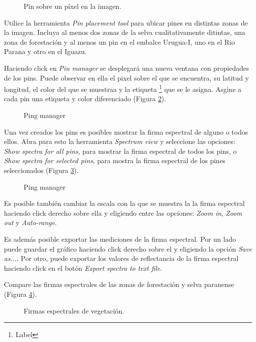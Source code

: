 \documentclass[a4paper,12pt]{book}
\begin{document}
\begin{figure}
    \caption{Pin sobre un píxel en la imagen.}
    \label{fig:pin}
\end{figure}

Utilice la herramienta \emph{Pin placement tool} para ubicar pines en distintas zonas de la imagen. Incluya al menos dos zonas de la selva cualitativamente ditintas, una zona de forestación y al menos un pin en el embalce Urugua-I, uno en el Rio Parana y otro en el Iguazu.

Haciendo click en \emph{Pin manager} se desplegará una nueva ventana  con propiedades de los pins. Puede observar en ella el pixel sobre el que se encuentra, su latitud y longitud, el color del que se muestraa y la etiqueta \footnote{Label} que se le asigna. Asgine a cada pin una etiqueta y color diferenciado (Figura \ref{fig:pmg}).

\begin{figure}
    \caption{Ping manager}
    \label{fig:pmg}
\end{figure}

Una vez creados los pins es posibles mostrar la firma espectral de alguno o todos ellos. Abra para esto la herramienta \emph{Spectrum view} y seleccione las opciones: \emph{Show spectra for all pins}, para mostrar la firma espectral de todos los pins, o \emph{Show spectra for selected pins}, para mostra la firma espectral de los pines seleccionados (Figura \ref{fig:spn}).

\begin{figure}
    \caption{Ping manager}
    \label{fig:spn}
\end{figure}

Es posible también cambiar la escala con la que se muestra la la firma espectral haciendo click derecho sobre ella y eligiendo entre las opciones: \emph{Zoom in}, \emph{Zoom out} y \emph{Auto-range}.

Es además posible exportar las mediciones de la firma espectral. Por un lado puede guardar el gráfico haciendo click derecho sobre el y eligiendo la opción \emph{Save as...}. Por otro, puede exportar los valores de reflectancia de la firma espectral haciendo click en el botón \emph{Export spectra to text file}.

Compare las firmas espectrales de las zonas de forestación y selva paranense (Figura \ref{fig:svg}).

\begin{figure}
    \caption{Firmas espectrales de vegetación.}
    \label{fig:svg}
\end{figure}
\end{document}

